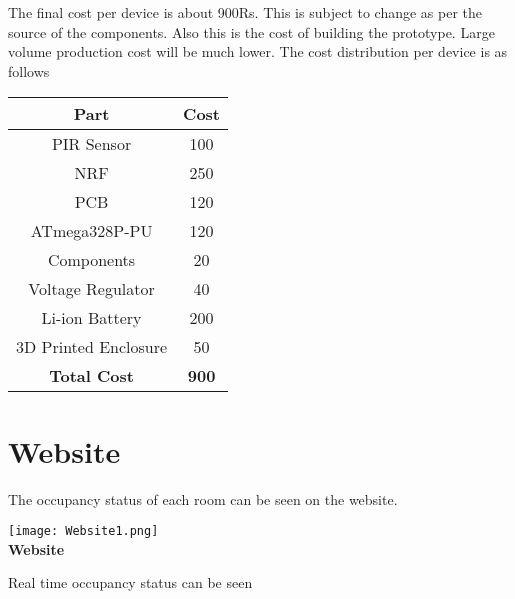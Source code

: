 The final cost per device is about 900Rs. This is subject to change as per the source of the components. Also this is the cost of building the prototype. Large volume production cost will be much lower.
The cost distribution per device is as follows
\\
\begin{center}
	\begin{tabular}{|c|c|}
		\hline
		\textbf{Part} & \textbf{Cost}	\\			\hline
		PIR Sensor & 100 \\							\hline
		NRF & 250 \\								\hline
		PCB & 120 \\								\hline
		ATmega328P-PU &120 \\						\hline
		Components & 20 \\							\hline
		Voltage Regulator & 40 \\					\hline
		Li-ion Battery & 200 \\						\hline
		3D Printed Enclosure & 50 \\				\hline
		\textbf{Total Cost}& \textbf{900} \\		\hline
	\end{tabular}
\end{center}

\pagebreak

\section{Website}
The occupancy status of each room can be seen on the website.

\begin{center}
	\texttt{[image: Website1.png]}
	\\ \textbf{Website}
\end{center}

Real time occupancy status can be seen 


